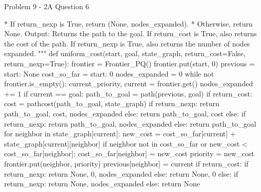 \begin{problem}{Problem 9 - 2A Question 6}
\begin{highlight}[Solution]
\begin{code}[Python]
                    * If return_nexp is True, return (None, nodes_expanded).
                    * Otherwise, return None.
        Output:
            Returns the path to the goal.
            If return_cost is True, also returns the cost of the path.
            If return_nexp is True, also returns the number of nodes expanded.
    """
    def uniform_cost(start, goal, state_graph, return_cost=False, return_nexp=True):
        frontier = Frontier_PQ()
        frontier.put(start, 0)
        previous = {start: None}
        cost_so_far = {start: 0}
        nodes_expanded = 0
        while not frontier.is_empty():
            current_priority, current = frontier.get()
            nodes_expanded += 1
            if current == goal:
                path_to_goal = path(previous, goal)
                if return_cost:
                    cost = pathcost(path_to_goal, state_graph)
                    if return_nexp:
                        return path_to_goal, cost, nodes_expanded
                    else:
                        return path_to_goal, cost
                else:
                    if return_nexp:
                        return path_to_goal, nodes_expanded
                    else:
                        return path_to_goal
            for neighbor in state_graph[current]:
                new_cost = cost_so_far[current] + state_graph[current][neighbor]
                if neighbor not in cost_so_far or new_cost < cost_so_far[neighbor]:
                    cost_so_far[neighbor] = new_cost
                    priority = new_cost
                    frontier.put(neighbor, priority)
                    previous[neighbor] = current
        if return_cost:
            if return_nexp:
                return None, 0, nodes_expanded
            else:
                return None, 0
        else:
            if return_nexp:
                return None, nodes_expanded
            else:
                return None
    \end{code}
    \end{highlight}
\end{problem}

